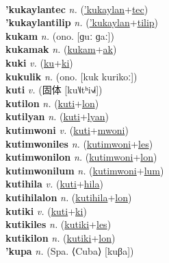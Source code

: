  \label{'kukaylanwon} \\
\textbf{'kukaylantec} \textit{n.} (\hyperref['kukaylan]{'kukaylan}+\hyperref[tec]{tec})
 \label{'kukaylantec} \\
\textbf{'kukaylantilip} \textit{n.} (\hyperref['kukaylan]{'kukaylan}+\hyperref[tilip]{tilip})
 \label{'kukaylantilip} \\
\textbf{kukam} \textit{n.} (ono. [ɡuː ɡaː])
 \label{kukam} \\
\textbf{kukamak} \textit{n.} (\hyperref[kukam]{kukam}+\hyperref[ak]{ak})
 \label{kukamak} \\
\textbf{kuki} \textit{v.} (\hyperref[ku]{ku}+\hyperref[ki]{ki})
 \label{kuki} \\
\textbf{kukulik} \textit{n.} (ono. [kuk kurikoː])
 \label{kukulik} \\
\textbf{kuti} \textit{v.} ({\chinese{}固体} [ku˥˩tʰi˧˩˧])
 \label{kuti} \\
\textbf{kutilon} \textit{n.} (\hyperref[kuti]{kuti}+\hyperref[lon]{lon})
 \label{kutilon} \\
\textbf{kutilyan} \textit{n.} (\hyperref[kuti]{kuti}+\hyperref[lyan]{lyan})
 \label{kutilyan} \\
\textbf{kutimwoni} \textit{v.} (\hyperref[kuti]{kuti}+\hyperref[mwoni]{mwoni})
 \label{kutimwoni} \\
\textbf{kutimwoniles} \textit{n.} (\hyperref[kutimwoni]{kutimwoni}+\hyperref[les]{les})
 \label{kutimwoniles} \\
\textbf{kutimwonilon} \textit{n.} (\hyperref[kutimwoni]{kutimwoni}+\hyperref[lon]{lon})
 \label{kutimwonilon} \\
\textbf{kutimwonilum} \textit{n.} (\hyperref[kutimwoni]{kutimwoni}+\hyperref[lum]{lum})
 \label{kutimwonilum} \\
\textbf{kutihila} \textit{v.} (\hyperref[kuti]{kuti}+\hyperref[hila]{hila})
 \label{kutihila} \\
\textbf{kutihilalon} \textit{n.} (\hyperref[kutihila]{kutihila}+\hyperref[lon]{lon})
 \label{kutihilalon} \\
\textbf{kutiki} \textit{v.} (\hyperref[kuti]{kuti}+\hyperref[ki]{ki})
 \label{kutiki} \\
\textbf{kutikiles} \textit{n.} (\hyperref[kutiki]{kutiki}+\hyperref[les]{les})
 \label{kutikiles} \\
\textbf{kutikilon} \textit{n.} (\hyperref[kutiki]{kutiki}+\hyperref[lon]{lon})
 \label{kutikilon} \\
\textbf{'kupa} \textit{n.} (Spa. ⟨Cuba⟩ [kuβa])
 \label{'kupa} \\

